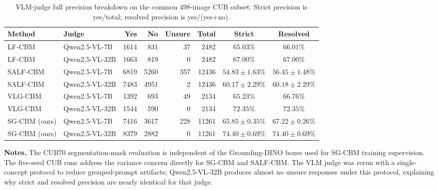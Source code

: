 \begin{table}[h]
\centering
\small
\caption{VLM-judge full precision breakdown on the common 498-image CUB subset. Strict precision is yes/total; resolved precision is yes/(yes+no).}
\begin{tabular}{llrrrrcc}
\toprule
Method & Judge & Yes & No & Unsure & Total & Strict & Resolved \\
\midrule
LF-CBM & Qwen2.5-VL-7B & 1614 & 831 & 37 & 2482 & $65.03\%$ & $66.01\%$ \\
LF-CBM & Qwen2.5-VL-32B & 1663 & 819 & 0 & 2482 & $67.00\%$ & $67.00\%$ \\
SALF-CBM & Qwen2.5-VL-7B & 6819 & 5260 & 357 & 12436 & $54.83 \pm 1.63\%$ & $56.45 \pm 1.48\%$ \\
SALF-CBM & Qwen2.5-VL-32B & 7483 & 4951 & 2 & 12436 & $60.17 \pm 2.29\%$ & $60.18 \pm 2.29\%$ \\
VLG-CBM & Qwen2.5-VL-7B & 1392 & 693 & 49 & 2134 & $65.23\%$ & $66.76\%$ \\
VLG-CBM & Qwen2.5-VL-32B & 1544 & 590 & 0 & 2134 & $72.35\%$ & $72.35\%$ \\
SG-CBM (ours) & Qwen2.5-VL-7B & 7416 & 3617 & 228 & 11261 & $65.85 \pm 0.35\%$ & $67.22 \pm 0.26\%$ \\
SG-CBM (ours) & Qwen2.5-VL-32B & 8379 & 2882 & 0 & 11261 & $74.40 \pm 0.69\%$ & $74.40 \pm 0.69\%$ \\
\bottomrule
\end{tabular}
\end{table}

\noindent\textbf{Notes.}
The CUB70 segmentation-mask evaluation is independent of the Grounding-DINO boxes used for SG-CBM training supervision. The five-seed CUB runs address the variance concern directly for SG-CBM and SALF-CBM. The VLM judge was rerun with a single-concept protocol to reduce grouped-prompt artifacts; Qwen2.5-VL-32B produces almost no unsure responses under this protocol, explaining why strict and resolved precision are nearly identical for that judge.

